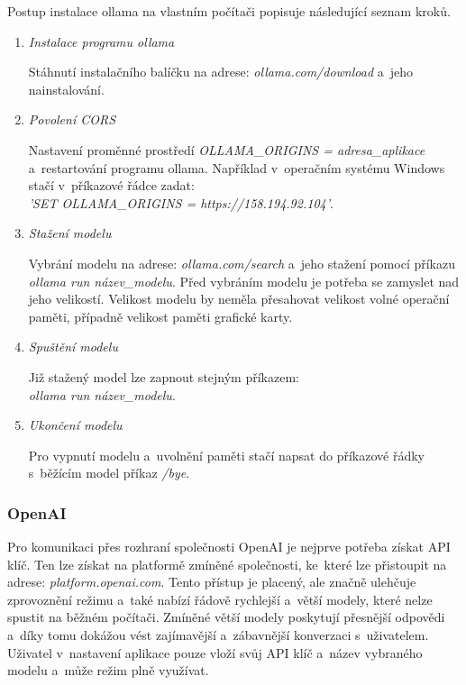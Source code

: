 \documentclass[
  master,
  program=ainfvs,
  biblatex,
  figures=true,
  tables=false,
  sourcecodes=true,
  glossaries,
  index
]{kidiplom}
\begin{document}
                Postup instalace ollama na vlastním počítači popisuje následující seznam kroků.

                \begin{enumerate}
                    \item \emph{Instalace programu ollama} \par
                        Stáhnutí instalačního balíčku na adrese: \emph{ollama.com/download} a~jeho nainstalování.
                    \item \emph{Povolení CORS} \par
                        Nastavení proměnné prostředí \emph{OLLAMA\_ORIGINS = adresa\_aplikace} a~restartování programu ollama.
                        Například v~operačním systému Windows stačí v~příkazové řádce zadat: \\\emph{'SET OLLAMA\_ORIGINS = https://158.194.92.104'}.
                        
                    \item \emph{Stažení modelu} \par
                        Vybrání modelu na adrese: \emph{ollama.com/search} a~jeho stažení pomocí příkazu \emph{ollama run název\_modelu}. 
                        Před vybráním modelu je potřeba se zamyslet nad jeho velikostí. Velikost modelu by neměla přesahovat velikost volné operační paměti, případně velikost paměti grafické karty.
                        
                    \item \emph{Spuštění modelu} \par
                        Již stažený model lze zapnout stejným příkazem: \\\emph{ollama run název\_modelu}.
                        
                    \item \emph{Ukončení modelu} \par
                        Pro vypnutí modelu a~uvolnění paměti stačí napsat do příkazové řádky s~běžícím model příkaz \emph{/bye}.
                \end{enumerate}

            \subsubsection{OpenAI}
                Pro komunikaci přes rozhraní společnosti OpenAI je nejprve potřeba získat API klíč. Ten lze získat na platformě zmíněné společnosti, ke~které lze přistoupit na adrese: \emph{platform.openai.com}. Tento přístup je placený, ale značně ulehčuje zprovoznění režimu a~také nabízí řádově rychlejší a~větší modely, které nelze spustit na běžném počítači. Zmíněné větší modely poskytují přesnější odpovědi a~díky tomu dokážou vést zajímavější a~zábavnější konverzaci s~uživatelem. Uživatel v~nastavení aplikace pouze vloží svůj API klíč a~název vybraného modelu a~může režim plně využívat.
        
\end{document}
